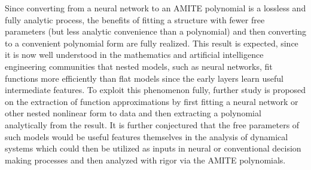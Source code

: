 Since converting from a neural network to an AMITE polynomial is a lossless and fully analytic process, the benefits of fitting a structure with fewer free parameters (but less analytic convenience than a polynomial) and then converting to a convenient polynomial form are fully realized.  This result is expected, since it is now well understood in the mathematics and artificial intelligence engineering communities that nested models, such as neural networks, fit functions more efficiently than flat models since the early layers learn useful intermediate features.  To exploit this phenomenon fully, further study is proposed on the extraction of function approximations by first fitting a neural network or other nested nonlinear form to data and then extracting a polynomial analytically from the result.  It is further conjectured that the free parameters of such models would be useful features themselves in the analysis of dynamical systems which could then be utilized as inputs in neural or conventional decision making processes and then analyzed with rigor via the AMITE polynomials.